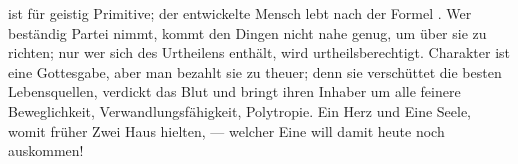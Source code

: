  ist für geistig Primitive; der entwickelte Mensch lebt nach der Formel . Wer beständig Partei nimmt, kommt den Dingen nicht nahe genug, um über sie zu richten; nur wer sich des Urtheilens enthält, wird urtheilsberechtigt. Charakter ist eine Gottesgabe, aber man bezahlt sie zu theuer; denn sie verschüttet die besten Lebensquellen, verdickt das Blut und bringt ihren Inhaber um alle feinere Beweglichkeit, Verwandlungsfähigkeit, Polytropie. Ein Herz und Eine Seele, womit früher Zwei Haus hielten, — welcher Eine will damit heute noch auskommen!
\par

